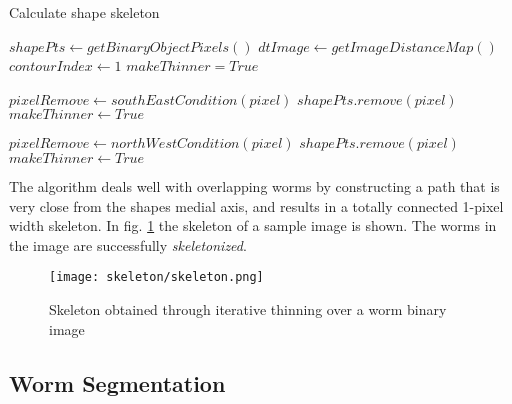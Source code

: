 \begin{algorithm}                     
\caption{Calculate shape skeleton}         
\label{thinninalg}                    
\begin{algorithmic}                   
\STATE $shapePts \leftarrow getBinaryObjectPixels()$
\STATE $dtImage \leftarrow getImageDistanceMap()$
\STATE $contourIndex \leftarrow 1$
\STATE $makeThinner = True$


\STATE {}
\STATE {}
\ELSE
\STATE $pixelRemove \leftarrow southEastCondition(pixel)$
\STATE $shapePts.remove(pixel)$
\STATE $makeThinner \leftarrow True$
\ENDIF

\ENDIF
\ENDFOR

\STATE {}
\STATE {}
\ELSE
\STATE $pixelRemove \leftarrow northWestCondition(pixel)$
\STATE $shapePts.remove(pixel)$
\STATE $makeThinner \leftarrow True$
\ENDIF
\ENDIF
\ENDFOR
\ENDWHILE
\STATE 
{}

\end{algorithmic}
\end{algorithm}

The algorithm deals well with overlapping worms by constructing a path that is very close
from the shapes medial axis, and results in a totally connected 1-pixel width skeleton.
In fig. \ref{fig:skeleton} the skeleton of a sample image is shown.
The worms in the image are successfully \emph{skeletonized}.

\begin{figure}[h t b p ! H]
 \centering
   \texttt{[image: skeleton/skeleton.png]}
 \caption{Skeleton obtained through iterative thinning over a worm binary image}
\label{fig:skeleton}
\end{figure} 


\subsection{Worm Segmentation}
\label{sec:metsegmentation}


